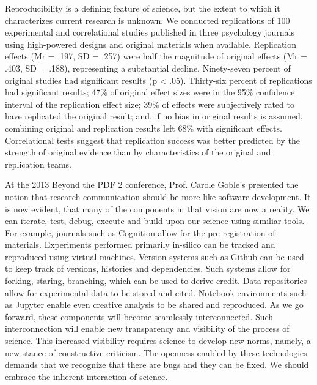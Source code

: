 \documentclass[a4paper,UKenglish]{dagrep}
\begin{document}
  


{}
\license
{}
Reproducibility is a defining feature of science, but the extent to which it characterizes 
current research is unknown.  We conducted replications of 100 experimental and 
correlational studies published in three psychology journals using high-powered designs and 
original materials when available.  Replication effects (Mr = .197, SD = .257) were half the 
magnitude of original effects (Mr = .403, SD = .188), representing a substantial decline.  
Ninety-seven percent of original studies had significant results (p < .05).  Thirty-six percent 
of replications had significant results; 47\% of original effect sizes were in the 95\% confidence 
interval of the replication effect size; 39\% of effects were subjectively rated to have replicated 
the original result; and, if no bias in original results is assumed, combining original and 
replication results left 68\% with significant effects. Correlational tests suggest that replication 
success was better predicted by the strength of original evidence than by characteristics of 
the original and replication teams.




{}
\license
At the 2013 Beyond the PDF 2 conference, Prof. Carole Goble's presented the
notion that research communication should be more like software development. It
is now evident, that many of the components in that vision are now a reality. We
can iterate, test, debug, execute and build upon our science using similiar
tools. For example, journals such as Cognition allow for the pre-registration of
materials. Experiments performed primarily in-silico can be tracked and
reproduced using virtual machines. Version systems such as Github can be used to
keep track of versions, histories and dependencies. Such systems allow for
forking, staring, branching, which can be used to derive credit. Data
repositories allow for experimental data to be stored and cited. Notebook
environments such as Jupyter enable even creative analysis to be shared and
reproduced. As we go forward, these components will become seamlessly
interconnected. Such interconnection will enable new transparency and visibility
of the process of science. This increased visibility requires science to develop
new norms, namely, a new stance of constructive criticism. The openness enabled
by these technologies demands that we recognize that there are bugs and they can
be fixed. We should embrace the inherent interaction of science. 
\end{document}
